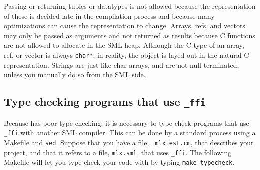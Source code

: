 Passing or returning tuples or datatypes is not allowed because the
representation of these is decided late in the compilation
process and because many optimizations can cause the representation to
change.  Arrays, refs, and vectors may only be passed as arguments and
not returned as results because C functions are not allowed to
allocate in the SML heap.  Although the C type of an array, ref, or
vector is always {\tt char*}, in reality, the object is layed out in
the natural C representation.
Strings are just
like char arrays, and are not null terminated, unless you manually do
so from the SML side.



\subsection{Type checking programs that use {\tt \_ffi}}

Because {\mlton} has poor type checking, it is necessary to type check programs
that use {\tt \_ffi} with another SML compiler.  This can be done by a standard
process using a Makefile and {\tt sed}.  Suppose that you have a file, {\tt
mlxtest.cm}, that describes your {\mlton} project, and that it refers to a file,
{\tt mlx.sml}, that uses {\tt \_ffi}.  The following Makefile will let you
type-check your code with {\smlnj} by typing {\tt make typecheck}.

